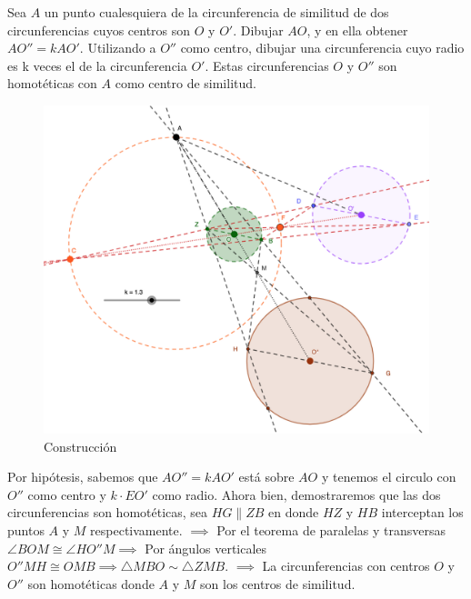 \begin{problema}
	Sea $A$ un punto cualesquiera de la circunferencia de similitud de dos circunferencias cuyos centros son $O$ y $O'$. Dibujar $AO$, y en ella obtener $AO''=k AO'$. Utilizando a  $O''$ como centro, dibujar una circunferencia cuyo radio es k veces el de la circunferencia $O'$. Estas circunferencias $O$ y $O''$ son homotéticas con $A$ como centro de similitud.
	\begin{figure}[H]
		\centering
		\includegraphics[scale=0.3]{Images/2}
		\caption{Construcción}
	\end{figure}
\end{problema}
\begin{dem}
	Por hipótesis, sabemos que $AO''=k AO'$ está sobre $AO$ y tenemos el circulo con $O''$ como centro y $k\cdot EO'$ como radio. Ahora bien, demostraremos que las dos circunferencias son homotéticas, sea $HG\parallel ZB$ en donde $HZ$  y  $HB$ interceptan los puntos $A$ y $M$ respectivamente. $\implies$ Por el teorema de paralelas y transversas $\angle BOM \cong \angle HO''M\implies$ Por ángulos verticales $O'' M H \cong OMB \implies \triangle MBO \sim  \triangle ZMB$.  $\implies$ La circunferencias con centros $O$ y $O''$ son homotéticas donde $A$ y $M$ son los centros de similitud. 
\end{dem}

